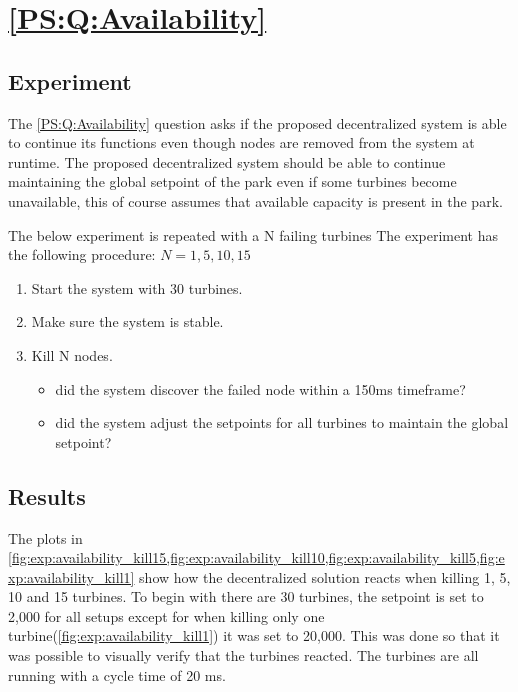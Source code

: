 
\section{\ref{PS:Q:Availability}}
\subsection{Experiment}
The \ref{PS:Q:Availability} question asks if the proposed decentralized system is able to continue its functions even though nodes are removed from the system at runtime.
The proposed decentralized system should be able to continue maintaining the global setpoint of the park even if some turbines become unavailable, this of course assumes that available capacity is present in the park.

The below experiment is repeated with a N failing turbines
The experiment has the following procedure:
$N = 1, 5, 10, 15$
\begin{enumerate}
	\item Start the system with 30 turbines.
	\item Make sure the system is stable.
	\item Kill N nodes.
	\begin{itemize}
		\item did the system discover the failed node within a 150ms timeframe?
		\item did the system adjust the setpoints for all turbines to maintain the global setpoint?
	\end{itemize}
\end{enumerate}

\subsection{Results}
\label{sec:res:availability}
The plots in \cref{fig:exp:availability_kill15,fig:exp:availability_kill10,fig:exp:availability_kill5,fig:exp:availability_kill1} show how the decentralized solution reacts when killing 1, 5, 10 and 15 turbines. To begin with there are 30 turbines, the setpoint is set to 2,000 for all setups except for when killing only one turbine(\cref{fig:exp:availability_kill1}) it was set to 20,000. This was done so that it was possible to visually verify that the turbines reacted.
The turbines are all running with a cycle time of 20 ms.

